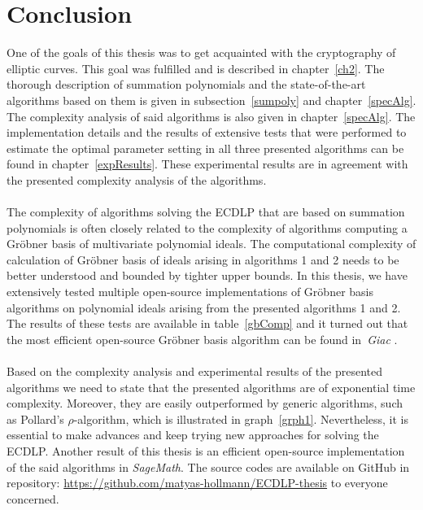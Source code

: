\documentclass[thesis=M,english]{FITthesis}[2012/10/20]
\theoremstyle{remark}
\theoremstyle{definition}
\begin{document}
\chapter{Conclusion}
One of the goals of this thesis was to get acquainted with the cryptography of elliptic curves. This goal was fulfilled and is described in chapter~\ref{ch2}. The thorough description of summation polynomials and the state-of-the-art algorithms based on them is given in subsection~\ref{sumpoly} and chapter~\ref{specAlg}. The complexity analysis of said algorithms is also given in chapter~\ref{specAlg}. The implementation details and the results of extensive tests that were performed to estimate the optimal parameter setting in all three presented algorithms can be found in chapter~\ref{expResults}. These experimental results are in agreement with the presented complexity analysis of the algorithms. 
\\ \\
\noindent The complexity of algorithms solving the ECDLP that are based on summation polynomials is often closely related to the complexity of algorithms computing a Gröbner basis of multivariate polynomial ideals. The computational complexity of calculation of Gröbner basis of ideals arising in algorithms 1 and 2 needs to be better understood and bounded by tighter upper bounds. In this thesis, we have extensively tested multiple open-source implementations of Gröbner basis algorithms on polynomial ideals arising from the presented algorithms 1 and 2. The results of these tests are available in table~\ref{gbComp} and it turned out that the most efficient open-source Gröbner basis algorithm can be found in~\textit{Giac} \cite{giac}. 
\\ \\
\noindent Based on the complexity analysis and experimental results of the presented algorithms we need to state that the presented algorithms are of exponential time complexity. Moreover, they are easily outperformed by generic algorithms, such as Pollard's $\rho$-algorithm, which is illustrated in graph~\ref{grph1}. Nevertheless, it is essential to make advances and keep trying new approaches for solving the ECDLP. Another result of this thesis is an efficient  open-source implementation of the said algorithms in \textit{SageMath}. The source codes are available on GitHub in repository: \url{https://github.com/matyas-hollmann/ECDLP-thesis} to everyone concerned.

%
%

\end{document}
